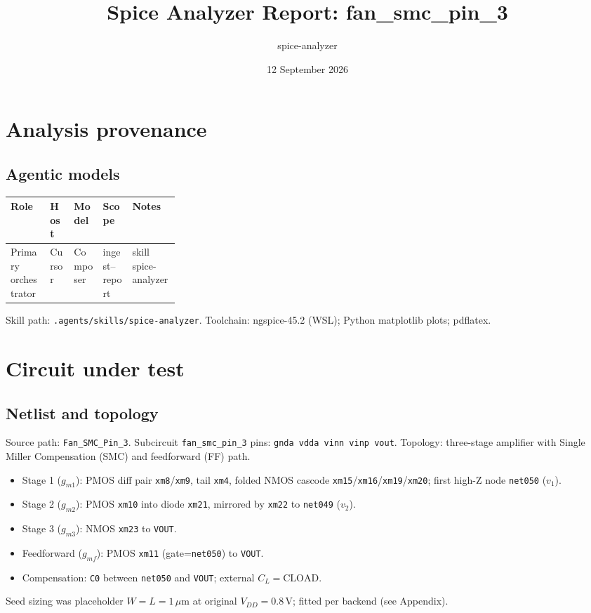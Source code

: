 \documentclass[11pt]{article}
\title{Spice Analyzer Report: fan\_smc\_pin\_3}
\author{spice-analyzer}
\date{12 September 2026}
\begin{document}
\maketitle
\tableofcontents
\clearpage

\section{Analysis provenance}
\subsection{Agentic models}
\begin{center}
{\small
\begin{tabular}{@{}llllp{0.28\linewidth}@{}}
\toprule
Role & Host & Model & Scope & Notes \\
\midrule
Primary orchestrator & Cursor & Composer & ingest--report & skill spice-analyzer \\
\bottomrule
\end{tabular}}
\end{center}
\footnotesize Skill path: \texttt{.agents/skills/spice-analyzer}.
Toolchain: ngspice-45.2 (WSL); Python matplotlib plots; pdflatex.

\section{Circuit under test}
\subsection{Netlist and topology}
Source path: \texttt{Fan\_SMC\_Pin\_3}.
Subcircuit \texttt{fan\_smc\_pin\_3} pins: \texttt{gnda vdda vinn vinp vout}.
Topology: three-stage amplifier with Single Miller Compensation (SMC) and feedforward (FF) path.
\begin{itemize}
\item Stage 1 (\(g_{m1}\)): PMOS diff pair \texttt{xm8}/\texttt{xm9}, tail \texttt{xm4}, folded NMOS cascode \texttt{xm15}/\texttt{xm16}/\texttt{xm19}/\texttt{xm20}; first high-Z node \texttt{net050} (\(v_1\)).
\item Stage 2 (\(g_{m2}\)): PMOS \texttt{xm10} into diode \texttt{xm21}, mirrored by \texttt{xm22} to \texttt{net049} (\(v_2\)).
\item Stage 3 (\(g_{m3}\)): NMOS \texttt{xm23} to \texttt{VOUT}.
\item Feedforward (\(g_{mf}\)): PMOS \texttt{xm11} (gate=\texttt{net050}) to \texttt{VOUT}.
\item Compensation: \texttt{C0} between \texttt{net050} and \texttt{VOUT}; external \(C_L=\mathrm{CLOAD}\).
\end{itemize}
Seed sizing was placeholder \(W=L=1\,\mu\mathrm{m}\) at original \(V_{DD}=0.8\,\mathrm{V}\); fitted per backend (see Appendix).
\end{document}
